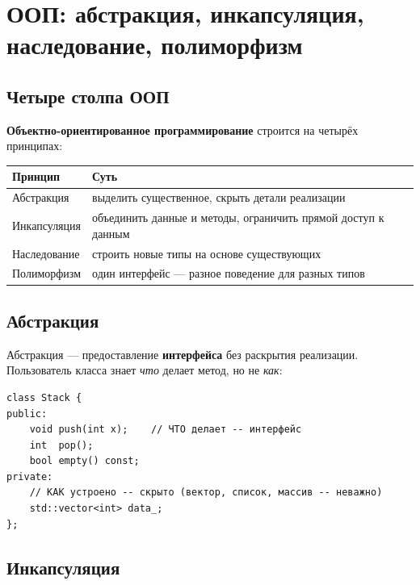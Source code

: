 
\section{ООП: абстракция, инкапсуляция, наследование, полиморфизм}

\subsection{Четыре столпа ООП}

\textbf{Объектно-ориентированное программирование} строится на четырёх принципах:

\begin{center}
\begin{tabular}{lp{9cm}}
\toprule
\textbf{Принцип} & \textbf{Суть} \\
\midrule
Абстракция     & выделить существенное, скрыть детали реализации \\
\addlinespace
Инкапсуляция   & объединить данные и методы, ограничить прямой доступ к данным \\
\addlinespace
Наследование   & строить новые типы на основе существующих \\
\addlinespace
Полиморфизм    & один интерфейс --- разное поведение для разных типов \\
\bottomrule
\end{tabular}
\end{center}

\subsection{Абстракция}

Абстракция --- предоставление \textbf{интерфейса} без раскрытия реализации.
Пользователь класса знает \textit{что} делает метод, но не \textit{как}:

\begin{lstlisting}
class Stack {
public:
    void push(int x);    // ЧТО делает -- интерфейс
    int  pop();
    bool empty() const;
private:
    // КАК устроено -- скрыто (вектор, список, массив -- неважно)
    std::vector<int> data_;
};
\end{lstlisting}

\subsection{Инкапсуляция}

